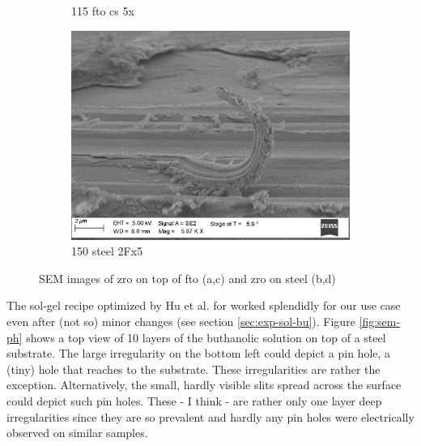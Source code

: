 \begin{figure}[bht]
\begin{subfigure}{.45\textwidth}
        \caption{115 fto cs 5x} \label{fig:sem-cs1}
    \end{subfigure}
    \begin{subfigure}{.45\textwidth}
        \centering
        \includegraphics[width=.8\textwidth]{Pics/sem/150_steel_cs_2Fx5.png}
        \caption{150 steel 2Fx5} \label{fig:sem-cs2}
    \end{subfigure}
	\caption{SEM images of \gls{zro} on top of \gls{fto} (a,c) and \gls{zro} on steel (b,d) } \label{fig:sem}
\end{figure}


The sol-gel recipe optimized by Hu et al.\cite{Hu2016} for  worked splendidly for our use case even after (not so) minor changes (see section \ref{sec:exp-sol-bu}). 
%
Figure \ref{fig:sem-ph} shows a top view of 10 layers of the buthanolic solution on top of a steel substrate. 
The large irregularity on the bottom left could depict a pin hole, a (tiny) hole that reaches to the substrate. 
These irregularities are rather the exception. 
Alternatively, the small, hardly visible slits spread across the surface could depict such pin holes. 
These - I think - are rather only one layer deep irregularities since they are so prevalent
and hardly any pin holes were electrically observed on similar samples. 

